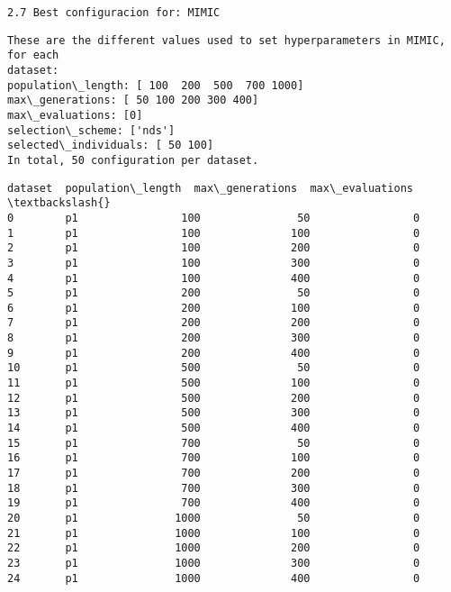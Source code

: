 \documentclass[11pt]{article}
\begin{document}
    \begin{verbatim}
2.7 Best configuracion for: MIMIC
\end{verbatim}

    \begin{Verbatim}[commandchars=\\\{\}]
These are the different values used to set hyperparameters in MIMIC, for each
dataset:
population\_length: [ 100  200  500  700 1000]
max\_generations: [ 50 100 200 300 400]
max\_evaluations: [0]
selection\_scheme: ['nds']
selected\_individuals: [ 50 100]
In total, 50 configuration per dataset.
    \end{Verbatim}

    
    \begin{Verbatim}[commandchars=\\\{\}]
    dataset  population\_length  max\_generations  max\_evaluations  \textbackslash{}
0        p1                100               50                0   
1        p1                100              100                0   
2        p1                100              200                0   
3        p1                100              300                0   
4        p1                100              400                0   
5        p1                200               50                0   
6        p1                200              100                0   
7        p1                200              200                0   
8        p1                200              300                0   
9        p1                200              400                0   
10       p1                500               50                0   
11       p1                500              100                0   
12       p1                500              200                0   
13       p1                500              300                0   
14       p1                500              400                0   
15       p1                700               50                0   
16       p1                700              100                0   
17       p1                700              200                0   
18       p1                700              300                0   
19       p1                700              400                0   
20       p1               1000               50                0   
21       p1               1000              100                0   
22       p1               1000              200                0   
23       p1               1000              300                0   
24       p1               1000              400                0   

\end{Verbatim}
\end{document}
